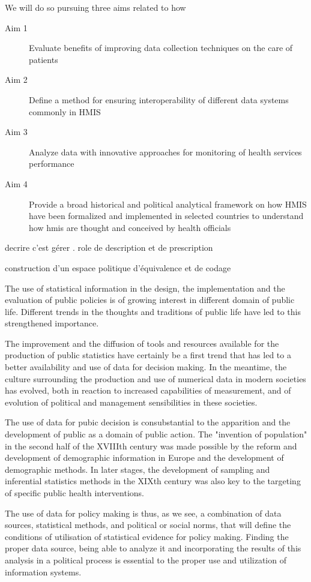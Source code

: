 \documentclass[a4paper,11pt,final,twoside]{article}
\begin{document}
We will do so pursuing three aims related to how
\begin{description}
    \item[Aim 1] Evaluate benefits of improving data collection techniques on the care of patients
    \item[Aim 2] Define a method for ensuring interoperability of different data systems commonly in HMIS
    \item[Aim 3] Analyze data with innovative approaches for monitoring of health services performance
    \item[Aim 4] Provide a broad historical and political analytical framework on how HMIS have been formalized and implemented in selected countries to understand how hmis are thought and conceived by health officials
\end{description}


decrire c'est gérer . role de description et de prescription

construction d'un espace politique d'équivalence et de codage



The use of statistical information in the design, the implementation and the evaluation of public policies is of growing interest in different domain of public life. Different trends in the thoughts and traditions of public life have led to this strengthened importance.

The improvement and the diffusion of tools and resources available for the production of public statistics have certainly be a first trend that has led to a better availability and use of data for decision making. In the meantime, the culture surrounding the production and use of numerical data in modern societies has evolved, both in reaction to increased capabilities of measurement, and of evolution of political and management sensibilities in these societies.

The use of data for pubic decision is consubstantial to the apparition and the development of public as a domain of public action. The "invention of population" in the second half of the XVIIIth century was made possible by the reform and development of demographic information in Europe and the development of demographic methods. In later stages, the development of sampling and inferential statistics methods in the XIXth century was also key to the targeting of specific public health interventions.

The use of data for policy making is thus, as we see, a combination of data sources, statistical methods, and political or social norms, that will define the conditions of utilisation of statistical evidence for policy making. Finding the proper data source, being able to analyze it and incorporating the results of this analysis in a political process is essential to the proper use and utilization of information systems.
\end{document}
